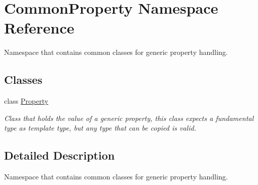 \hypertarget{namespace_common_property}{}\section{Common\+Property Namespace Reference}
\label{namespace_common_property}


Namespace that contains common classes for generic property handling.  


\subsection*{Classes}
\begin{DoxyCompactItemize}
\item 
class \mbox{\hyperlink{class_common_property_1_1_property}{Property}}
\begin{DoxyCompactList}\small\item\em Class that holds the value of a generic property, this class expects a fundamental type as template type, but any type that can be copied is valid. \end{DoxyCompactList}\end{DoxyCompactItemize}


\subsection{Detailed Description}
Namespace that contains common classes for generic property handling. 
